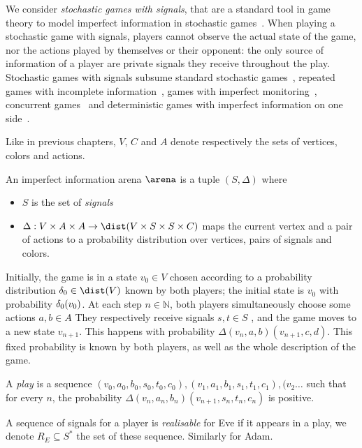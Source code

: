 We consider \emph{stochastic games with signals}, that are a standard tool in game theory to model imperfect information in stochastic games~\cite{sorinafirst,dinahnicolas1,renault2}.
When playing a stochastic game with signals, players cannot observe
the actual state of the game, nor the actions played by themselves or
their opponent: the only source of information of a player are private
signals they receive throughout the play.  Stochastic games with
signals subsume standard stochastic games~\cite{shapley}, repeated
games with incomplete information~\cite{aumann}, games with imperfect
monitoring~\cite{dinahnicolas1}, concurrent games~\cite{dAH00} and
deterministic games with imperfect information on one
side~\cite{reif,chdr07}.

Like in previous chapters, $V$, $C$ and $A$  
denote respectively the sets
	of vertices, colors and actions.
\begin{definition}
An imperfect information arena $\arena$ is a tuple $(S,\Delta)$ where 
\begin{itemize}
	\item $S$ is the set of \emph{signals}
	\item $\Delta : V \times A \times A \to \dist(V \times S \times S \times C)$
	 maps the current vertex and a pair of actions to a probability distribution
	 over vertices, pairs of signals and colors.
\end{itemize}
\end{definition}

\newcommand{\NN}{\mathbb{N}}
\newcommand{\RR}{\mathbb{R}}


Initially, the game is in a state $v_0 \in V$ chosen according to a probability distribution
$\ini\in\dist(V)$ known by both players; the initial state is
$v_0$ with probability $\delta_0(v_0)$.  At each step $n\in\NN$, both players
simultaneously choose some actions $a,b \in A$
 They respectively receive signals
$s,t \in S$ ,
 and the game moves to a
new state $v_{n+1}$.  This happens with probability
$\Delta(v_{n},a,b)(v_{n+1},c,d)$.
{This fixed probability is known by both players,
as well as the whole description of the game.}

A \emph{play} is a sequence $(v_0,a_0,b_0,s_0,t_0,c_0),(v_1,a_1,b_1,s_1,t_1,c_1),(v_2\ldots$
such that for every $n$, the probability $\Delta(v_{n},a_n,b_n)(v_{n+1},s_n,t_n,c_n)$
is positive.

A sequence of signals for a player
is \emph{realisable} for Eve if it appears in a play,
we denote $R_E \subseteq S^*$ the set of these sequence.
Similarly for Adam.


